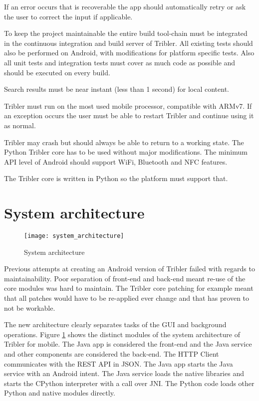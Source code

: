 If an error occurs that is recoverable the app should automatically retry or ask the user to correct the input if applicable.

To keep the project maintainable the entire build tool-chain must be integrated in the continuous integration and build server of Tribler.
All existing tests should also be performed on Android, with modifications for platform specific tests.
Also all unit tests and integration tests must cover as much code as possible and should be executed on every build.



Search results must be near instant (less than 1 second) for local content.

Tribler must run on the most used mobile processor, compatible with ARMv7.
If an exception occurs the user must be able to restart Tribler and continue using it as normal.

Tribler may crash but should always be able to return to a working state.
The Python Tribler core has to be used without major modifications.
The minimum API level of Android should support WiFi, Bluetooth and NFC features.

The Tribler core is written in Python so the platform must support that.



\section{System architecture}

\begin{figure}[H]
	\centering
	\texttt{[image: system\_architecture]}
	\caption{System architecture}
	\label{fig:system_architecture}
\end{figure}

Previous attempts at creating an Android version of Tribler failed with regards to maintainability.
Poor separation of front-end and back-end meant re-use of the core modules was hard to maintain.
The Tribler core patching for example meant that all patches would have to be re-applied ever change and that has proven to not be workable.

The new architecture clearly separates tasks of the GUI and background operations.
Figure \ref{fig:system_architecture} shows the distinct modules of the system architecture of Tribler for mobile.
The Java app is considered the front-end and the Java service and other components are considered the back-end.
The HTTP Client communicates with the REST API in JSON.
The Java app starts the Java service with an Android intent.
The Java service loads the native libraries and starts the CPython interpreter with a call over JNI.
The Python code loads other Python and native modules directly.


